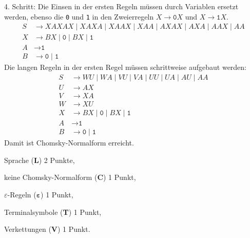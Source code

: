 \begin{loesung}
\begin{teilaufgaben}
4. Schritt: Die Einsen in der ersten Regeln müssen durch Variablen
ersetzt werden, ebenso die \texttt{0} und \texttt{1} in den Zweierregeln
$X\to\texttt{0}X$ und $X\to\texttt{1}X$.
\begin{align*}
S & \to XAXAX \;|\; XAXA \;|\; XAAX \;|\; XAA \;|\; AXAX \;|\; AXA  \;|\; AAX \;|\; AA  
\\
X & \to
BX
\;|\;
\texttt{0}
\;|\;
BX
\;|\;
\texttt{1}
\\
A&\to \texttt{1}
\\
B&\to \texttt{0} \;|\; \texttt{1}
\end{align*}
Die langen Regeln in der ersten Regel müssen schrittweise aufgebaut werden:
\begin{align*}
S & \to WU \;|\; WA \;|\; VU \;|\; VA \;|\; UU \;|\; UA  \;|\; AU \;|\; AA  
\\
U & \to AX
\\
V & \to XA
\\
W & \to XU
\\
X & \to
BX
\;|\;
\texttt{0}
\;|\;
BX
\;|\;
\texttt{1}
\\
A&\to \texttt{1}
\\
B&\to \texttt{0} \;|\; \texttt{1}
\end{align*}
Damit ist Chomsky-Normalform erreicht.
\qedhere
\end{teilaufgaben}
\end{loesung}

\begin{bewertung}
\begin{teilaufgaben}
\item Sprache ({\bf L}) 2 Punkte,
\item keine Chomsky-Normalform ({\bf C}) 1 Punkt,
\item $\varepsilon$-Regeln ({$\bm \varepsilon$}) 1 Punkt,
\item Terminalsymbole ({\bf T}) 1 Punkt,
\item Verkettungen ({\bf V}) 1 Punkt.
\end{teilaufgaben}
\end{bewertung}
